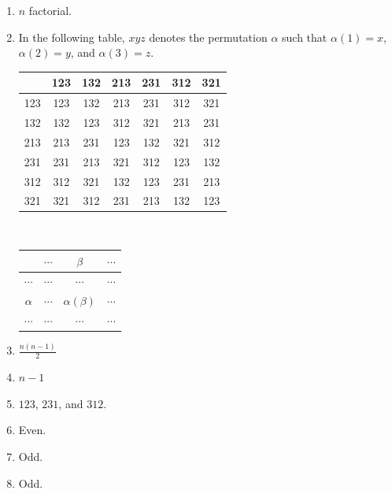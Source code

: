 \documentclass{article}
\begin{document}
\begin{enumerate}
  \item[1401:] $n$ factorial.
  \item[1402:] In the following table, $xyz$ denotes the permutation $\alpha$ such that $\alpha(1)=x$, $\alpha(2)=y$, and $\alpha(3)=z$.

    \begin{tabular}{c|cccccc}
      $\ $ & 123 & 132 & 213 & 231 & 312 & 321 \\
      \hline
      123  & 123 & 132 & 213 & 231 & 312 & 321 \\
      132  & 132 & 123 & 312 & 321 & 213 & 231 \\
      213  & 213 & 231 & 123 & 132 & 321 & 312 \\
      231  & 231 & 213 & 321 & 312 & 123 & 132 \\
      312  & 312 & 321 & 132 & 123 & 231 & 213 \\
      321  & 321 & 312 & 231 & 213 & 132 & 123 \\
    \end{tabular}
    $\ \ \ $
    \begin{tabular}{c|ccc}
      $\ $     & $\cdots$ &     $\beta$     & $\cdots$ \\
      \hline
      $\cdots$ & $\cdots$ &     $\cdots$    & $\cdots$ \\
      $\alpha$ & $\cdots$ & $\alpha(\beta)$ & $\cdots$ \\
      $\cdots$ & $\cdots$ &     $\cdots$    & $\cdots$ \\
    \end{tabular}

  \item[1403:] $\frac{n(n-1)}{2}$
  \item[1404:] $n-1$
  \item[1409:] $123$, $231$, and $312$.
  \item[1410:] Even.
  \item[1412:] Odd.
  \item[1413:] Odd.
\end{enumerate}
\vspace{0.5cm}
\end{document}
